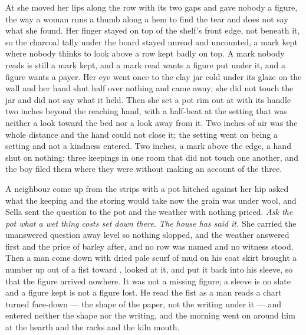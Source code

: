 At  she moved her lips along the row with its two gaps and gave nobody a figure, the way a woman runs a thumb along a hem to find the tear and does not say what she found. Her finger stayed on top of the shelf's front edge, not beneath it, so the charcoal tally under the board stayed unread and uncounted, a mark kept where nobody thinks to look above a row kept badly on top. A mark nobody reads is still a mark kept, and a mark read wants a figure put under it, and a figure wants a payer. Her eye went once to the clay jar cold under its glaze on the wall and her hand shut half over nothing and came away; she did not touch the jar and did not say what it held. Then she set a pot rim out at  with its handle two inches beyond the reaching hand, with a half-beat at the setting that was neither a look toward the bed nor a look away from it. Two inches of air was the whole distance and the hand could not close it; the setting went on being a setting and not a kindness entered. Two inches, a mark above the edge, a hand shut on nothing: three keepings in one room that did not touch one another, and the boy filed them where they were without making an account of the three.

A neighbour come up from the strips with a pot hitched against her hip asked what the keeping and the storing would take now the grain was under wool, and Sella sent the question to the pot and the weather with nothing priced. \emph{Ask the pot what a wet thing costs set down there. The house has said it.} She carried the unanswered question away level so nothing slopped, and the weather answered first and the price of barley after, and no row was named and no witness stood. Then a man come down  with dried pale scurf of mud on his coat skirt brought a number up out of a fist toward , looked at it, and put it back into his sleeve, so that the figure arrived nowhere. It was not a missing figure; a sleeve is no slate and a figure kept is not a figure lost. He read the fist as a man reads a chart turned face-down --- the shape of the paper, not the writing under it --- and entered neither the shape nor the writing, and the morning went on around him at the hearth and the racks and the kiln mouth.

\scenebreak

